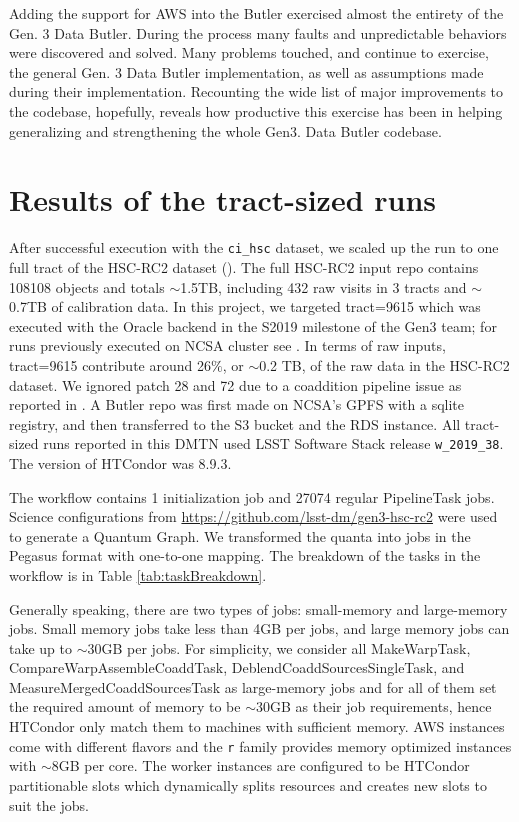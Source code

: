 Adding the support for AWS into the Butler exercised almost the entirety of the Gen. 3 Data Butler. During the process many faults and unpredictable behaviors were discovered and solved. Many problems touched, and continue to exercise, the general Gen. 3 Data Butler implementation, as well as assumptions made during their implementation. Recounting the wide list of major improvements to the codebase, hopefully, reveals how productive this exercise has been in helping generalizing and strengthening the whole Gen3. Data Butler codebase.

\section{Results of the tract-sized runs}

After successful execution with the \texttt{ci\_hsc} dataset, we scaled up the run to one full tract of the HSC-RC2 dataset ().
The full HSC-RC2 input repo contains 108108 objects and totals $\sim$1.5TB, including 432 raw visits in 3 tracts and $\sim$0.7TB of calibration data.
In this project, we targeted tract=9615 which was executed with the Oracle backend in the S2019 milestone of the Gen3 team; for runs previously executed on NCSA cluster see .
In terms of raw inputs, tract=9615 contribute around 26$\%$, or $\sim$0.2 TB, of the raw data in the HSC-RC2 dataset.
We ignored patch 28 and 72 due to a coaddition pipeline issue as reported in .
A Butler repo was first made on NCSA's GPFS with a sqlite registry, and then transferred to the S3 bucket and the RDS instance.
All tract-sized runs reported in this DMTN used LSST Software Stack release \texttt{w\_2019\_38}.
The version of HTCondor was 8.9.3.

The workflow contains 1 initialization job and 27074 regular PipelineTask jobs.
Science configurations from \url{https://github.com/lsst-dm/gen3-hsc-rc2} were used to generate a Quantum Graph.
We transformed the quanta into jobs in the Pegasus format with one-to-one mapping.
The breakdown of the tasks in the workflow is in Table \ref{tab:taskBreakdown}.



Generally speaking, there are two types of jobs: small-memory and large-memory jobs.
Small memory jobs take less than 4GB per jobs, and large memory jobs can take up to $\sim$30GB per jobs.
For simplicity, we consider all MakeWarpTask, CompareWarpAssembleCoaddTask, DeblendCoaddSourcesSingleTask, and MeasureMergedCoaddSourcesTask as large-memory jobs and for all of them set the required amount of memory to be $\sim$30GB as their job requirements, hence HTCondor only match them to machines with sufficient memory.
AWS instances come with different flavors and the \texttt{r} family provides memory optimized instances with $\sim$8GB per core.
The worker instances are configured to be HTCondor partitionable slots which dynamically splits resources and creates new slots to suit the jobs.

